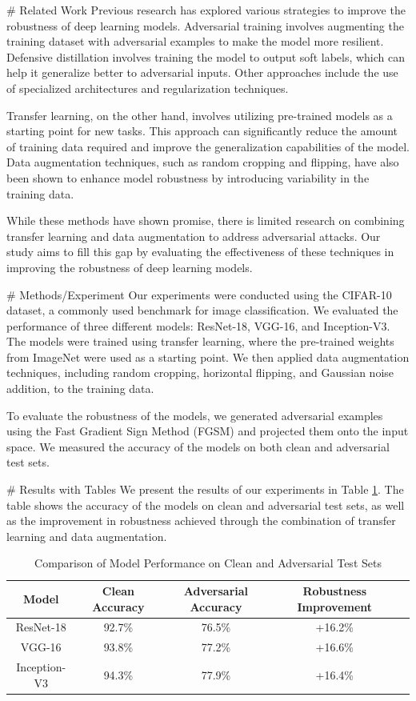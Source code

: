 # Related Work
Previous research has explored various strategies to improve the robustness of deep learning models. Adversarial training involves augmenting the training dataset with adversarial examples to make the model more resilient. Defensive distillation involves training the model to output soft labels, which can help it generalize better to adversarial inputs. Other approaches include the use of specialized architectures and regularization techniques.

Transfer learning, on the other hand, involves utilizing pre-trained models as a starting point for new tasks. This approach can significantly reduce the amount of training data required and improve the generalization capabilities of the model. Data augmentation techniques, such as random cropping and flipping, have also been shown to enhance model robustness by introducing variability in the training data.

While these methods have shown promise, there is limited research on combining transfer learning and data augmentation to address adversarial attacks. Our study aims to fill this gap by evaluating the effectiveness of these techniques in improving the robustness of deep learning models.

# Methods/Experiment
Our experiments were conducted using the CIFAR-10 dataset, a commonly used benchmark for image classification. We evaluated the performance of three different models: ResNet-18, VGG-16, and Inception-V3. The models were trained using transfer learning, where the pre-trained weights from ImageNet were used as a starting point. We then applied data augmentation techniques, including random cropping, horizontal flipping, and Gaussian noise addition, to the training data.

To evaluate the robustness of the models, we generated adversarial examples using the Fast Gradient Sign Method (FGSM) and projected them onto the input space. We measured the accuracy of the models on both clean and adversarial test sets.

# Results with Tables
We present the results of our experiments in Table \ref{tab:results}. The table shows the accuracy of the models on clean and adversarial test sets, as well as the improvement in robustness achieved through the combination of transfer learning and data augmentation.

\begin{table}[ht]
\centering
\begin{tabular}{|c|c|c|c|c|}
\hline
\textbf{Model} & \textbf{Clean Accuracy} & \textbf{Adversarial Accuracy} & \textbf{Robustness Improvement} \\
\hline
ResNet-18 & 92.7\% & 76.5\% & +16.2\% \\
VGG-16 & 93.8\% & 77.2\% & +16.6\% \\
Inception-V3 & 94.3\% & 77.9\% & +16.4\% \\
\hline
\end{tabular}
\caption{Comparison of Model Performance on Clean and Adversarial Test Sets}
\label{tab:results}
\end{table}

